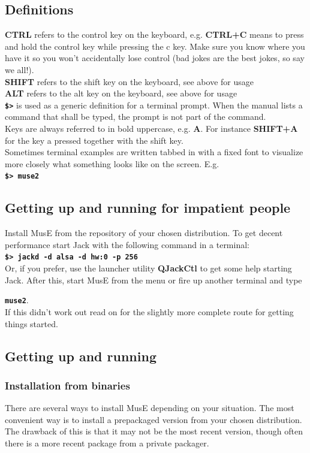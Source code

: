 \documentclass[a4paper]{report}
\newcommand{\key}[1]{\textbf{#1}}
\newcommand{\shell}[1]{\texttt{\textbf{#1}}}
\begin{document}
\subsection{Definitions}
\key{CTRL} refers to the control key on the keyboard, e.g. \key{CTRL+C}
means to press and hold the control key while pressing the c key. Make sure
you know where you have it so you won't accidentally lose control
(bad jokes are the best jokes, so say we all!).\\
\key{SHIFT} refers to the shift key on the keyboard, see above for usage\\
\key{ALT} refers to the alt key on the keyboard, see above for usage\\
\shell{\$>} is used as a generic definition for a terminal prompt. When the
manual lists a command that shall be typed, the prompt is not part of the
command.\\
Keys are always referred to in bold uppercase, e.g. \key{A}. For instance
\key{SHIFT+A} for the key a pressed together with the shift key.\\
Sometimes terminal examples are written tabbed in with a fixed font to
visualize more closely what something looks like on the screen.
E.g.\\
\hspace*{1cm}\shell{\$> muse2}\\

\subsection{Getting up and running for impatient people}
Install MusE from the repository of your chosen distribution.
To get decent performance start Jack with the following command in a
terminal:\\
\hspace*{1cm}\shell{\$> jackd -d alsa -d hw:0 -p 256}\\
Or, if you prefer, use the launcher utility \textbf{QJackCtl} to get some
help starting Jack.
After this, start MusE from the menu or fire up another terminal and
type

\shell{muse2}.\\
If this didn't work out read on for the slightly more complete route for
getting things started.

\subsection{Getting up and running}
\subsubsection{Installation from binaries}
There are several ways to install MusE depending on your situation. The
most convenient way is to install a prepackaged version from your chosen
distribution. The drawback of this is that it may not be the most recent
version, though often there is a more recent package from a private packager.
\end{document}
